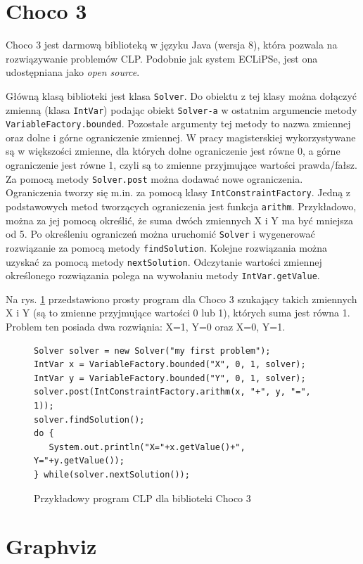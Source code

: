 \section{Choco 3}


Choco 3 \cite{Choco3} jest darmową biblioteką w języku Java (wersja 8), która pozwala na rozwiązywanie problemów CLP. Podobnie jak system ECLiPSe, jest ona udostępniana jako \textit{open source}.

Główną klasą biblioteki jest klasa \texttt{Solver}. Do obiektu z tej klasy  można dołączyć zmienną (klasa \texttt{IntVar}) podając obiekt \texttt{Solver-a} w ostatnim argumencie metody \texttt{VariableFactory.\-bounded}. Pozostałe argumenty tej metody to nazwa zmiennej oraz dolne i górne ograniczenie zmiennej. W pracy magisterskiej wykorzystywane są w większości zmienne, dla których dolne ograniczenie jest równe 0, a górne ograniczenie jest równe 1, czyli są to zmienne przyjmujące wartości prawda/fałsz. Za pomocą metody \texttt{Solver.post} można dodawać nowe ograniczenia. Ograniczenia tworzy się m.in. za pomocą klasy \texttt{IntConstraintFactory}. Jedną z podstawowych metod tworzących ograniczenia jest funkcja \texttt{arithm}. Przykładowo, można za jej pomocą określić, że suma dwóch zmiennych X i Y ma być mniejsza od 5. Po określeniu ograniczeń można uruchomić \texttt{Solver} i wygenerować rozwiązanie za pomocą metody \texttt{findSolution}. Kolejne rozwiązania można uzyskać za pomocą metody \texttt{nextSolution}. Odczytanie wartości zmiennej określonego rozwiązania polega na wywołaniu metody \texttt{IntVar.getValue}. 

Na rys. \ref{fig:choco} przedstawiono prosty program dla Choco 3 szukający takich zmiennych X i Y (są to zmienne przyjmujące wartości 0 lub 1), których suma jest równa 1. Problem ten posiada dwa rozwiąnia: X=1, Y=0 oraz X=0, Y=1.

\begin{figure}[H]
\begin{verbatim}
Solver solver = new Solver("my first problem");
IntVar x = VariableFactory.bounded("X", 0, 1, solver);
IntVar y = VariableFactory.bounded("Y", 0, 1, solver);
solver.post(IntConstraintFactory.arithm(x, "+", y, "=", 1));
solver.findSolution();
do {
   System.out.println("X="+x.getValue()+", Y="+y.getValue());
} while(solver.nextSolution());
\end{verbatim}
\caption{Przykładowy program CLP dla biblioteki Choco 3}
\label{fig:choco}
\end{figure}

\section{Graphviz}

